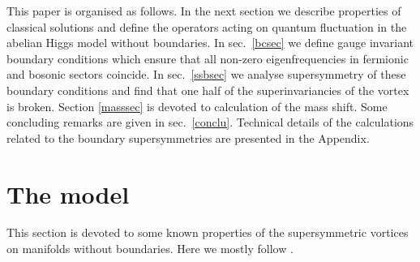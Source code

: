 \documentclass[a4paper,12pt]{article}
\begin{document}
This paper is organised as follows. 
In the next section we describe properties of classical solutions
and define the operators acting on quantum fluctuation in the
abelian Higgs model without boundaries. In sec.\ \ref{bcsec} we
define gauge invariant boundary conditions which ensure that all
non-zero eigenfrequencies in fermionic and bosonic sectors
coincide. In sec.\ \ref{ssbsec} we analyse supersymmetry of these
boundary conditions and find that one half of the
superinvariancies of the vortex is broken. Section \ref{masssec} is
devoted to calculation of the mass shift. Some concluding remarks
are given in sec.\ \ref{conclu}. Technical details of the
calculations related to the boundary supersymmetries are presented
in the Appendix.

\section{The model}
This section is devoted to some known properties of the supersymmetric vortices
on manifolds without boundaries. Here we mostly follow 
\cite{Lee:yc,Lee:1994pm}.
\end{document}
